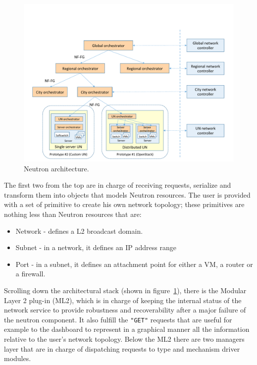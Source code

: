 \begin{figure}[h]
	\centering
	\includegraphics[clip= true, width= \columnwidth, page=53, trim=0cm 8cm 0cm 0cm ]{images/Pictures_definitivo.pdf}
	\caption{Neutron architecture.}
	\label{fig:neutron_structure}
\end{figure}
The first two from the top are in charge of receiving requests, serialize and transform them into objects that models Neutron resources. The user is provided with a set of primitive to create his own network topology; these primitives are nothing less than Neutron resources that are:
\begin{itemize}
\label{neutronresourcelist}
    \item Network - defines a L2 broadcast domain.
    \item Subnet - in a network, it defines an IP address range
    \item Port - in a subnet, it defines an attachment point for either a VM, a router or a firewall.
\end{itemize}
Scrolling down the architectural stack (shown in figure~\ref{fig:neutron_structure}), there is the Modular Layer 2 plug-in (ML2), which is in charge of keeping the internal status of the network service to provide robustness and recoverability after a major failure of the neutron component. It also fulfill the \texttt{"GET"} requests that are useful for example to the dashboard to represent in a graphical manner all the information relative to the user's network topology.
Below the ML2 there are two managers layer that are in charge of dispatching requests to type and mechanism driver modules.
